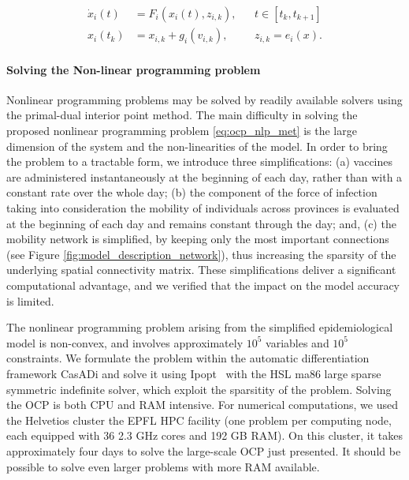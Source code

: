 \begin{align*}
\dot x_i(t) &= F_i(x_i(t),z_{i,k}), && t\in[t_k,t_{k+1}] \\
x_i(t_k) &= x_{i,k} + g_i(v_{i,k}), && z_{i,k} = e_i(x).
\end{align*}

\paragraph{Solving the Non-linear programming problem} Nonlinear programming problems may be solved by readily available solvers using the primal-dual interior point method. The main difficulty in solving the proposed nonlinear programming problem \eqref{eq:ocp_nlp_met} is the large dimension of the system and the non-linearities of the model. In order to bring the problem to a tractable form, we introduce three simplifications: (a) vaccines are administered instantaneously at the beginning of each day, rather than with a constant rate over the whole day; (b) the component of the force of infection taking into consideration the mobility of individuals across provinces is evaluated at the beginning of each day and remains constant through the day; and, (c) the mobility network is simplified, by keeping only the most important connections (see Figure \ref{fig:model_description_network}), thus increasing the sparsity of the underlying spatial connectivity matrix. These simplifications deliver a significant computational advantage, and we verified that the impact on the model accuracy is limited. 


The nonlinear programming problem arising from the simplified epidemiological model is non-convex, and involves approximately $10^{5}$ variables and $10^5$ constraints. We formulate the problem within the automatic differentiation framework CasADi\cite{Andersson:CasADiSoftwareFramework:2018} and solve it using Ipopt~\cite{Wachter:ImplementationInteriorpointFilter:2006} with the HSL ma86 large sparse symmetric indefinite solver\cite{HSLCollectionFortran}, which exploit the sparsitity of the problem. 
Solving the OCP is both CPU and RAM intensive. For numerical computations, we used the Helvetios cluster the EPFL HPC facility (one problem per computing node, each equipped with 36 2.3 GHz cores and 192 GB RAM). On this cluster, it takes approximately four days to solve the large-scale OCP just presented. It should be possible to solve even larger problems with more RAM available. 

